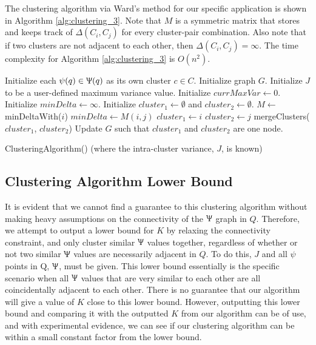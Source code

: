 \documentclass[conference]{IEEEtran}
\theoremstyle{plain}%
\begin{document}
The clustering algorithm via Ward's method for our specific application is shown in Algorithm \ref{alg:clustering_3}. Note that $M$ is a symmetric matrix that stores and keeps track of $\Delta(C_i,C_j)$ for every cluster-pair combination. Also note that if two clusters are not adjacent to each other, then $\Delta(C_i,C_j) = \infty$. The time complexity for Algorithm \ref{alg:clustering_3} is $O(n^2)$.
\begin{algorithm}
\begin{algorithmic}[1]
\STATE Initialize each $\psi(q) \in \Uppsi(q)$ as its own cluster $c \in C$.
\STATE Initialize graph $G$. 
\STATE Initialize $J$ to be a user-defined maximum variance value.
\STATE Initialize $currMaxVar \leftarrow 0$.
\STATE Initialize $minDelta \leftarrow \infty$.
\STATE Initialize $cluster_1 \leftarrow \emptyset$ and $cluster_2 \leftarrow \emptyset$.
\STATE $M \leftarrow$ minDeltaWith($i$) 
\STATE $minDelta \leftarrow M(i, j)$
\STATE $cluster_1 \leftarrow i$
\STATE $cluster_2 \leftarrow j$
\ENDIF
\ENDFOR
{}
\RETURN {}
\ENDIF
\STATE mergeClusters($cluster_1$, $cluster_2$)
\STATE Update $G$ such that $cluster_1$ and $cluster_2$ are one node.
\ENDWHILE
\end{algorithmic}
\caption{ClusteringAlgorithm() (where the intra-cluster variance, $J$, is known)} 
\label{alg:clustering_3}
\end{algorithm}

\subsection{Clustering Algorithm Lower Bound}

It is evident that we cannot find a guarantee to this clustering algorithm without making heavy assumptions on the connectivity of the $\Uppsi$ graph in $Q$. Therefore, we attempt to output a lower bound for $K$ by relaxing the connectivity constraint, and only cluster similar $\Uppsi$ values together, regardless of whether or not two similar $\Uppsi$ values are necessarily adjacent in $Q$. To do this, $J$ and all $\psi$ points in Q, $\Uppsi$, must be given. This lower bound essentially is the specific scenario when all $\Uppsi$ values that are very similar to each other are all coincidentally adjacent to each other. There is no guarantee that our algorithm will give a value of $K$ close to this lower bound. However, outputting this lower bound and comparing it with the outputted $K$ from our algorithm can be of use, and with experimental evidence, we can see if our clustering algorithm can be within a small constant factor from the lower bound.
\end{document}
